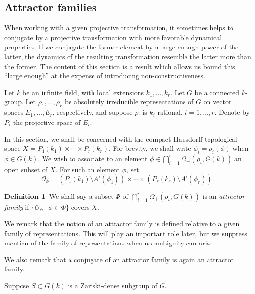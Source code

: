 \documentclass{amsart}
\theoremstyle{plain}
\theoremstyle{definition}
\newtheorem{definition}[theorem]{Definition}
\theoremstyle{remark}
\begin{document}
\subsection{Attractor families}\label{sec:attractorfamilies}
When working with a given projective transformation, it sometimes helps to conjugate by
a projective transformation with more favorable dynamical properties. If we conjugate
the former element
by a large enough power of the latter, the dynamics of the resulting transformation
resemble the latter more than the former. The content of this section is a result which
allows us bound this ``large enough'' at the expense of introducing non-constructiveness.

Let $k$ be an infinite field, with local
extensions $k_{1}, \ldots,
k_{r}$. Let $G$ be a connected $k$-group. Let $\rho_{1}, \ldots, \rho_{r}$ be absolutely
irreducible
representations of $G$ on vector spaces $E_{1}, \ldots, E_{r}$, respectively, and
suppose $\rho_{i}$ is $k_{i}$-rational, $i = 1, \ldots, r$. Denote by $P_{i}$ the
projective space of $E_{i}$.

In this section, we shall be concerned with the compact Hausdorff topological
space $X = P_{1}(k_{1})\times\cdots\times P_{r}(k_{r})$. For brevity, we shall write $\phi_{i}
= \rho_{i}(\phi)$ when $\phi \in G(k)$.
We wish to associate to an
element $\phi \in \bigcap_{i=1}^{r} \Omega_{+}(\rho_{i}, G(k))$ an
open subset of $X$. For such an element $\phi$, set
$$\mathcal{O}_{\phi} = (P_{1}(k_{1})\setminus A'(\phi_{1}))\times\cdots\times
(P_{r}(k_{r}) \setminus A'(\phi_{r})).$$

\begin{definition}
We shall say a subset $\Phi$ of $\bigcap_{i=1}^{r} \Omega_{+}(\rho_{i}, G(k))$ is an
\emph{attractor family} if
$\{\mathcal{O}_{\phi}\mid \phi \in \Phi\}$ covers $X$.
\end{definition}
\noindent We remark that the notion of an attractor family is defined relative to a given
family of representations. This will play an important role later, but we suppress
mention of the family of representations when no ambiguity can arise.

We also remark that a conjugate of an attractor family is again an attractor family.

Suppose $S \subset G(k)$ is a Zariski-dense subgroup of $G$.
\end{document}
